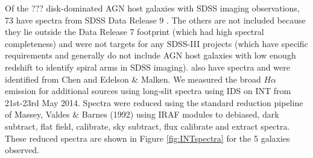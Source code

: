 Of the ??? disk-dominated AGN host galaxies with SDSS imaging observations, 73 have spectra from SDSS Data Release 9 \citep{dr9_ref}. The others are not included because they lie outside the Data Release 7 footprint (which had high spectral completeness) and were not targets for any SDSS-III projects (which have specific requirements and generally do not include AGN host galaxies with low enough redshift to identify spiral arms in SDSS imaging). { also have spectra and were identified from Chen and Edelson \& Malken.}  We measured the broad $H\alpha$ emission for  { additional sources} using long-slit spectra using IDS on INT from 21st-23rd May 2014. Spectra were reduced using the standard reduction pipeline of Massey, Valdes \& Barnes (1992) using IRAF modules to debiased, dark subtract, flat field, calibrate, sky subtract, flux calibrate and extract spectra. These reduced spectra are shown in Figure \ref{fig:INTspectra} for the 5 galaxies observed.


